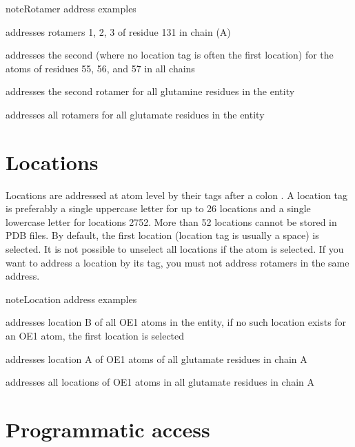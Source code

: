 \documentclass[letterpaper,10pt,english]{sphinxmanual}
\begin{document}
\begin{sphinxadmonition}{note}{Rotamer address examples}

  addresses rotamers 1, 2, 3 of residue 131 in chain (A)

 addresses the second  (where no location tag is often the first location) for the  atoms of residues 55, 56, and 57 in all chains

 addresses the second rotamer for all glutamine residues in the entity

 addresses all rotamers for all glutamate residues in the entity
\end{sphinxadmonition}


\section{Locations}
\label{\detokenize{object_access:locations}}
Locations are addressed at atom level by their tags after a colon \sphinxcode{\sphinxupquote{:}}.
A location tag is preferably a single upper\sphinxhyphen{}case letter for up to 26 locations and a single lower\sphinxhyphen{}case letter for locations 27\sphinxhyphen{}52. More than 52 locations cannot be stored in PDB files.
By default, the first location (location tag is usually a space) is selected. It is not possible to unselect all locations if the atom is selected.
If you want to address a location by its tag, you must not address rotamers in the same address.

\begin{sphinxadmonition}{note}{Location address examples}

  addresses location B of all OE1 atoms in the entity, if no such location exists for an OE1 atom, the first location is selected

 addresses location A of OE1 atoms of all glutamate residues in chain A

 addresses all locations of OE1 atoms in all glutamate residues in chain A
\end{sphinxadmonition}


\section{Programmatic access}
\label{\detokenize{object_access:programmatic-access}}
\begin{sphinxVerbatim}[commandchars=\\\{\}]
\PYG{p}{[}\PYG{p}{]}  
\end{sphinxVerbatim}
\end{document}
